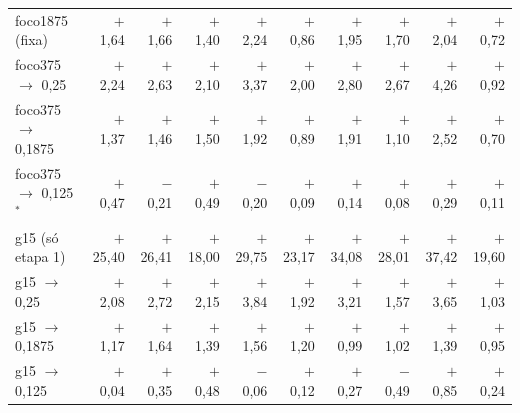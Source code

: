 \begin{tabular}{@{}l rrrrrrrrr@{}}
foco1875 (fixa) & $+$1{,}64 & $+$1{,}66 & $+$1{,}40 & $+$2{,}24 & $+$0{,}86 & $+$1{,}95 & $+$1{,}70 & $+$2{,}04 & $+$0{,}72 \\
foco375 $\to$ 0,25 & $+$2{,}24 & $+$2{,}63 & $+$2{,}10 & $+$3{,}37 & $+$2{,}00 & $+$2{,}80 & $+$2{,}67 & $+$4{,}26 & $+$0{,}92 \\
foco375 $\to$ 0,1875 & $+$1{,}37 & $+$1{,}46 & $+$1{,}50 & $+$1{,}92 & $+$0{,}89 & $+$1{,}91 & $+$1{,}10 & $+$2{,}52 & $+$0{,}70 \\
foco375 $\to$ 0,125$^{*}$ & $+$0{,}47 & $-$0{,}21 & $+$0{,}49 & $-$0{,}20 & $+$0{,}09 & $+$0{,}14 & $+$0{,}08 & $+$0{,}29 & $+$0{,}11 \\
g15 (só etapa 1) & $+$25{,}40 & $+$26{,}41 & $+$18{,}00 & $+$29{,}75 & $+$23{,}17 & $+$34{,}08 & $+$28{,}01 & $+$37{,}42 & $+$19{,}60 \\
g15 $\to$ 0,25 & $+$2{,}08 & $+$2{,}72 & $+$2{,}15 & $+$3{,}84 & $+$1{,}92 & $+$3{,}21 & $+$1{,}57 & $+$3{,}65 & $+$1{,}03 \\
g15 $\to$ 0,1875 & $+$1{,}17 & $+$1{,}64 & $+$1{,}39 & $+$1{,}56 & $+$1{,}20 & $+$0{,}99 & $+$1{,}02 & $+$1{,}39 & $+$0{,}95 \\
g15 $\to$ 0,125 & $+$0{,}04 & $+$0{,}35 & $+$0{,}48 & $-$0{,}06 & $+$0{,}12 & $+$0{,}27 & $-$0{,}49 & $+$0{,}85 & $+$0{,}24 \\
\bottomrule
\end{tabular}
